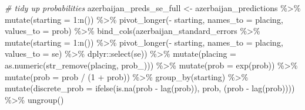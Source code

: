 \documentclass[
]{book}
\newenvironment{Shaded}{\begin{snugshade}}{\end{snugshade}}
\newcommand{\AttributeTok}[1]{\textcolor[rgb]{0.77,0.63,0.00}{#1}}
\newcommand{\CommentTok}[1]{\textcolor[rgb]{0.56,0.35,0.01}{\textit{#1}}}
\newcommand{\DecValTok}[1]{\textcolor[rgb]{0.00,0.00,0.81}{#1}}
\newcommand{\FunctionTok}[1]{\textcolor[rgb]{0.00,0.00,0.00}{#1}}
\newcommand{\NormalTok}[1]{#1}
\newcommand{\OtherTok}[1]{\textcolor[rgb]{0.56,0.35,0.01}{#1}}
\newcommand{\SpecialCharTok}[1]{\textcolor[rgb]{0.00,0.00,0.00}{#1}}
\newcommand{\StringTok}[1]{\textcolor[rgb]{0.31,0.60,0.02}{#1}}
\begin{document}
\begin{Shaded}
\begin{Highlighting}[]
\CommentTok{\# tidy up probabilities}
\NormalTok{azerbaijan\_preds\_se\_full }\OtherTok{\textless{}{-}}\NormalTok{ azerbaijan\_predictions }\SpecialCharTok{\%\textgreater{}\%}
  \FunctionTok{mutate}\NormalTok{(}\AttributeTok{starting =} \DecValTok{1}\SpecialCharTok{:}\FunctionTok{n}\NormalTok{()) }\SpecialCharTok{\%\textgreater{}\%}
  \FunctionTok{pivot\_longer}\NormalTok{(}\SpecialCharTok{{-}}\NormalTok{ starting, }\AttributeTok{names\_to =} \StringTok{\textquotesingle{}placing\textquotesingle{}}\NormalTok{, }\AttributeTok{values\_to =} \StringTok{\textquotesingle{}prob\textquotesingle{}}\NormalTok{) }\SpecialCharTok{\%\textgreater{}\%} 
  \FunctionTok{bind\_cols}\NormalTok{(azerbaijan\_standard\_errors }\SpecialCharTok{\%\textgreater{}\%} \FunctionTok{mutate}\NormalTok{(}\AttributeTok{starting =} \DecValTok{1}\SpecialCharTok{:}\FunctionTok{n}\NormalTok{()) }\SpecialCharTok{\%\textgreater{}\%}
  \FunctionTok{pivot\_longer}\NormalTok{(}\SpecialCharTok{{-}}\NormalTok{ starting, }\AttributeTok{names\_to =} \StringTok{\textquotesingle{}placing\textquotesingle{}}\NormalTok{, }\AttributeTok{values\_to =} \StringTok{\textquotesingle{}se\textquotesingle{}}\NormalTok{) }\SpecialCharTok{\%\textgreater{}\%}
\NormalTok{    dplyr}\SpecialCharTok{::}\FunctionTok{select}\NormalTok{(se)) }\SpecialCharTok{\%\textgreater{}\%}
  \FunctionTok{mutate}\NormalTok{(}\AttributeTok{placing =} \FunctionTok{as.numeric}\NormalTok{(}\FunctionTok{str\_remove}\NormalTok{(placing, }\StringTok{\textquotesingle{}prob\_\textquotesingle{}}\NormalTok{))) }\SpecialCharTok{\%\textgreater{}\%}
  \FunctionTok{mutate}\NormalTok{(}\AttributeTok{prob =} \FunctionTok{exp}\NormalTok{(prob)) }\SpecialCharTok{\%\textgreater{}\%}
  \FunctionTok{mutate}\NormalTok{(}\AttributeTok{prob =}\NormalTok{ prob }\SpecialCharTok{/}\NormalTok{ (}\DecValTok{1} \SpecialCharTok{+}\NormalTok{ prob)) }\SpecialCharTok{\%\textgreater{}\%}
  \FunctionTok{group\_by}\NormalTok{(starting) }\SpecialCharTok{\%\textgreater{}\%} 
  \FunctionTok{mutate}\NormalTok{(}\AttributeTok{discrete\_prob =} \FunctionTok{ifelse}\NormalTok{(}\FunctionTok{is.na}\NormalTok{(prob }\SpecialCharTok{{-}} \FunctionTok{lag}\NormalTok{(prob)), prob, (prob }\SpecialCharTok{{-}} \FunctionTok{lag}\NormalTok{(prob)))) }\SpecialCharTok{\%\textgreater{}\%}
  \FunctionTok{ungroup}\NormalTok{()}


\end{Highlighting}
\end{Shaded}
\end{document}
